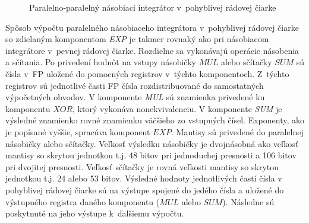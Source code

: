 \begin{figure}[h]
\centering
{}
\caption{Paralelno-paralelný násobiaci integrátor v~pohyblivej rádovej čiarke}
\label{ppni_fp}
\end{figure}
\bigskip

Spôsob výpočtu paralelného násobiaceho integrátora v~pohyblivej rádovej čiarke so zdielaným komponentom \textit{EXP} je takmer rovnaký ako pri násobiacom integrátore v~pevnej rádovej čiarke. Rozdielne sa vykonávajú operácie násobenia a sčítania. Po privedení hodnôt na vstupy násobičky $ MUL $ alebo sčítačky $ SUM $ sú čísla v~FP uložené do pomocných registrov v~týchto komponentoch. Z~týchto registrov sú jednotlivé časti FP čísla rozdistribuované do samostatných výpočetných obvodov. V komponente \textit{MUL} sú znamienka privedené ku komponentu $ XOR $, ktorý vykonáva nonekvivalenciu. V komponente \textit{SUM} je výsledné znamienko rovné znamienku väčšieho zo vstupných čísel. Exponenty, ako je popísané vyššie, spracúva komponent $ EXP $. Mantisy sú privedené do paralelnej násobičky alebo sčítačky. Veľkosť výsledku násobičky je dvojnásobná ako veľkosť mantisy so skrytou jednotkou t.j. 48 bitov pri jednoduchej presnosti a 106 bitov pri dvojitej presnosti. Veľkosť sčítačky je rovná veľkosti mantisy so skrytou jednotkou t.j. 24 alebo 53 bitov. Výsledné hodnoty jednotlivých častí čísla v pohyblivej rádovej čiarke sú na výstupe spojené do jedého čísla a uložené do výstupného registra daného komponentu ($ MUL $ alebo $ SUM $). Následne sú poskytnuté na jeho výstupe k~ďalšiemu výpočtu.

